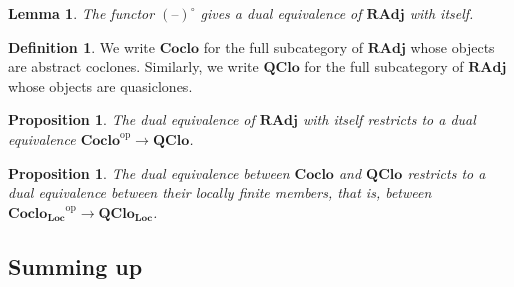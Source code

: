 \documentclass[11pt, a4paper, twoside,leqno]{amsart}
\newcommand{\cat}[1]{\mathbf{#1}}
\newcommand{\thg}{{\mathord{\text{--}}}}
\numberwithin{equation}{section}
\theoremstyle{plain}
\newtheorem{Prop}[Thm]{Proposition}
\newtheorem{Lemma}[Thm]{Lemma}
\theoremstyle{definition}
\newtheorem{Defn}[Thm]{Definition}
\begin{document}
\begin{Lemma}
  \label{lem:Radj-self-dual}
  The functor \((\thg)^{\circ}\) gives a dual equivalence of \(\cat{RAdj}\) with itself.
\end{Lemma}

\begin{Defn}
  \label{def:subcats-radj}
  We write \(\cat{Coclo}\) for the full subcategory of \(\cat{RAdj}\)
  whose objects are abstract coclones. Similarly, we write
  \(\cat{QClo}\) for the full subcategory of \(\cat{RAdj}\)
  whose objects are quasiclones.
\end{Defn}

\begin{Prop}
  \label{prop:coclo-dual-Qclo}
  The dual equivalence of \(\cat{RAdj}\) with itself restricts to a dual
  equivalence \(\cat{Coclo}^{\mathrm{op}} \rightarrow
  \cat{QClo}\).
\end{Prop}



\begin{Prop}
  \label{prop:restricted-dual-coclo-Qclo}
  The dual equivalence between \(\cat{Coclo}\) and \(\cat{QClo}\) restricts to a dual
  equivalence between their locally finite members, that is, between \(\cat{Coclo_{Loc}}^{\mathrm{op}} \rightarrow \cat{QClo_{Loc}}\).
\end{Prop}


\subsection{Summing up}
\label{sec:summing-up}
\end{document}
